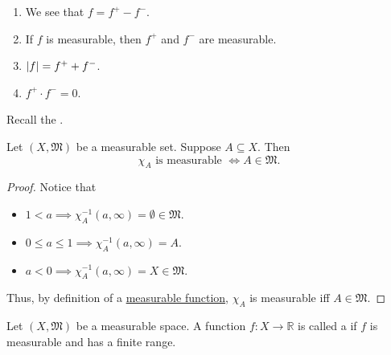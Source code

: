 \documentclass[notoc,notitlepage]{tufte-book}
\begin{document}
\begin{remark}\label{remark:f_plus_and_f_minus_are_measurable}
  \begin{enumerate}
    \item We see that $f = f^+ - f^-$.
    \item {}
      If $f$ is measurable, then $f^+$ and $f^-$ are measurable.
    \item $\left|f\right| = f^+ + f^-$.
    \item $f^+ \cdot f^- = 0$.
  \end{enumerate}
\end{remark}

Recall the .

\begin{propo}\label{propo:characteristic_function_of_measurable_sets_are_measurable}
  Let $(X, \mathfrak{M})$ be a measurable set. Suppose $A \subseteq X$.
  Then
  \begin{equation*}
    \chi_A \text{ is measurable } \iff A \in \mathfrak{M}.
  \end{equation*}
\end{propo}

\begin{proof}
  Notice that
  \begin{itemize}
    \item $1 < a \implies \chi_A^{-1}(a, \infty) = \emptyset \in \mathfrak{M}$.
    \item $0 \leq a \leq 1 \implies \chi_A^{-1}(a, \infty) = A$.
    \item $a < 0 \implies \chi_A^{-1}(a, \infty) = X \in \mathfrak{M}$.
  \end{itemize}
  Thus, by definition of a
  \hyperref[defn:measurable_functions]{measurable function},
  $\chi_A$ is measurable iff $A \in \mathfrak{M}$.
\end{proof}

\begin{defn}\label{defn:simple_function}
  Let $(X, \mathfrak{M})$ be a measurable space.
  A function $f : X \to \mathbb{R}$ is called a 
  if $f$ is measurable and has a finite range.
\end{defn}
\end{document}
